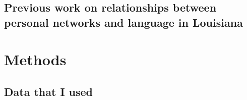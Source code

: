     \subsection{Previous work on relationships between personal networks and language in Louisiana}
  \section{Methods}
    \subsection{Data that I used}

